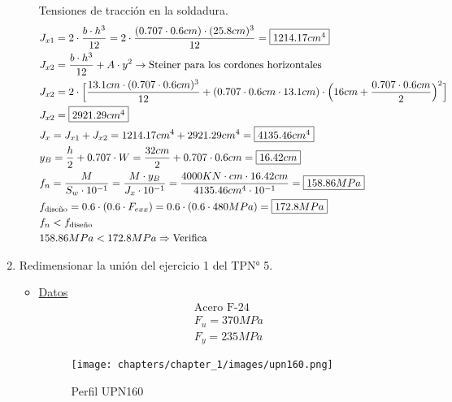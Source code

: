 \begin{enumerate}
\begin{itemize}
Tensiones de tracción en la soldadura.\\
\begin{align*}
& J_{x1} = 2 \cdot \frac{b \cdot h^3}{12} = 2 \cdot \frac{(0.707 \cdot 0.6cm) \cdot (25.8cm)^3}{12} = \framebox{$1214.17cm^4$} \\
& J_{x2} = \frac{b \cdot h^3}{12} + A \cdot y^2 \rightarrow \text{Steiner para los cordones horizontales} \\
& J_{x2} = 2 \cdot \Big[\frac{13.1cm \cdot (0.707 \cdot 0.6cm)^3}{12} + (0.707 \cdot 0.6cm \cdot 13.1cm) \cdot \Big(16cm+ \frac{0.707 \cdot 0.6cm}{2}\Big)^2\Big] \\
& J_{x2} = \framebox{$2921.29cm^4$} \\
& J_x = J_{x1} + J_{x2} = 1214.17cm^4 + 2921.29cm^4 = \framebox{$4135.46cm^4$} \\
& y_B = \frac{h}{2} + 0.707 \cdot W = \frac{32cm}{2} + 0.707 \cdot 0.6cm = \framebox{$16.42cm$} \\
& f_n = \frac{M}{S_w \cdot 10^{-1}} = \frac{M \cdot y_B}{J_x \cdot 10^{-1}} = \frac{4000 KN \cdot cm \cdot 16.42cm}{4135.46cm^4 \cdot 10^{-1}} = \framebox{$158.86MPa$} \\
& f_{\text{diseño}} = 0.6 \cdot (0.6 \cdot F_{exx}) = 0.6 \cdot (0.6 \cdot 480MPa) = \framebox{$172.8MPa$} \\
& f_n < f_{\text{diseño}} \\
& 158.86MPa < 172.8MPa \Rightarrow \text{Verifica}
\end{align*}
\end{itemize}
\newpage
\item Redimensionar la unión del ejercicio 1 del TPN° 5.
\begin{itemize}
\item \underline{Datos}
\begin{align*}
& \text{Acero F-24}\\
& F_u = 370MPa\\
& F_y = 235MPa
\end{align*}

\begin{figure}[H]
\begin{center}
     \texttt{[image: chapters/chapter\_1/images/upn160.png]}
\end{center}
\caption{Perfil UPN160}
\end{figure}


\end{itemize}
\end{enumerate}
